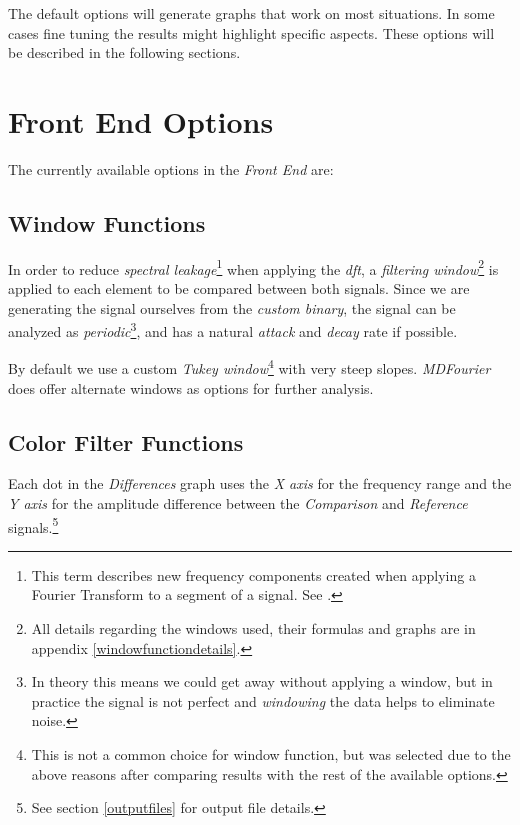 \documentclass[10pt,a4paper]{report}
\newcommand{\ac}[1]{\textit{\acrshort{#1}}}
\begin{document}
\begin{appendices}
The default options will generate graphs that work on most situations. In some cases fine tuning the results might highlight specific aspects. These options will be described in the following sections.

\section{Front End Options}

The currently available options in the \textit{Front End} are:

\subsection{Window Functions}
\label{windows}

In order to reduce \textit{spectral leakage}\footnote{This term describes new frequency components created when applying a Fourier Transform to a segment of a signal. See \cite{leakage}.} when applying the \ac{dft}, a \textit{filtering window}\footnote{All details regarding the windows used, their formulas and graphs are in appendix \ref{windowfunctiondetails}.} is applied to each element to be compared between both signals. Since we are generating the signal ourselves from the \textit{custom binary}, the signal can be analyzed as \textit{periodic}\footnote{In theory this means we could get away without applying a window, but in practice the signal is not perfect and \textit{windowing} the data helps to eliminate noise.}, and has a natural \textit{attack} and \textit{decay} rate if possible.

By default we use a custom \textit{Tukey window}\footnote{This is not a common choice for window function, but was selected due to the above reasons after comparing results with  the rest of the available options.} with very steep slopes. \textit{MDFourier} does offer alternate windows as options for further analysis.

\subsection{Color Filter Functions}
\label{colorfilter}

Each dot in the \textit{Differences} graph uses the \textit{X axis} for the frequency range and the \textit{Y axis} for the amplitude difference between the \textit{Comparison} and \textit{Reference} signals.\footnote{See section \ref{outputfiles} for output file details.}


\end{appendices}
\end{document}
